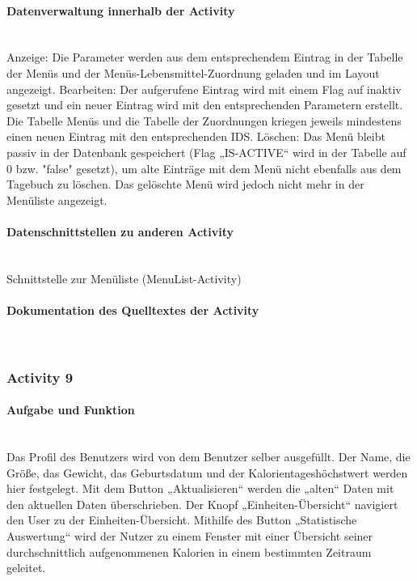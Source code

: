 \paragraph{Datenverwaltung innerhalb der Activity}\\
Anzeige: Die Parameter werden aus dem entsprechendem Eintrag in der Tabelle der Menüs und der Menüs-Lebensmittel-Zuordnung geladen und im Layout angezeigt. 
Bearbeiten: Der aufgerufene Eintrag wird mit einem Flag auf inaktiv gesetzt und ein neuer Eintrag wird mit den entsprechenden Parametern erstellt. Die Tabelle Menüs und die Tabelle der Zuordnungen kriegen jeweils mindestens einen neuen Eintrag mit den entsprechenden IDS. 
Löschen: Das Menü bleibt passiv in der Datenbank gespeichert (Flag „IS-ACTIVE“ wird in der Tabelle auf 0 bzw. "false" gesetzt), um alte Einträge mit dem Menü nicht ebenfalls aus dem Tagebuch zu löschen. Das gelöschte Menü wird jedoch nicht mehr in der Menüliste angezeigt.

\paragraph{Datenschnittstellen zu anderen Activity}\\
Schnittstelle zur Menüliste (MenuList-Activity)

\paragraph{Dokumentation des Quelltextes der Activity}\\

\subsubsection{Activity 9}

\paragraph{Aufgabe und Funktion}\\
Das Profil des Benutzers wird von dem Benutzer selber ausgefüllt. Der Name, die Größe, das Gewicht, das Geburtsdatum und der Kalorientageshöchstwert werden hier festgelegt. Mit dem Button „Aktualisieren“ werden die „alten“ Daten mit den aktuellen Daten überschrieben. Der Knopf „Einheiten-Übersicht“ navigiert den User zu der Einheiten-Übersicht. Mithilfe des Button „Statistische Auswertung“ wird der Nutzer zu einem Fenster mit einer Übersicht seiner durchschnittlich aufgenommenen Kalorien in einem bestimmten Zeitraum geleitet.

